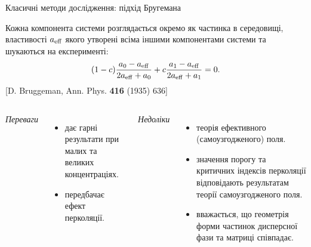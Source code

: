 \documentclass[10pt]{beamer}
\begin{document}
\begin{frame}{Класичні методи дослідження: підхід Бругемана}

\footnotesize
    Кожна компонента системи розглядається окремо як частинка в середовищі, властивості $a_{\rm eff}$ якого утворені всіма іншими компонентами системи та шукаються на експерименті:
    \begin{equation}\label{eq:EMA}
        (1-c) \frac{a_0 - a_{\rm eff}}{2a_{\rm eff} + a_0} + c \frac{a_1 - a_{\rm eff}}{2a_{\rm eff} + a_1} = 0.
    \end{equation}
    [D. Bruggeman, Ann. Phys. {\bf 416} (1935) 636]
    \vspace{-5pt}
    \begin{columns}[T,onlytextwidth]
          \begin{center}
          {\it Переваги}
          \end{center}
          \vspace{-10pt}
          \begin{itemize}
              \item дає гарні результати при малих та великих концентраціях.
              \item передбачає ефект перколяції.
          \end{itemize}
    
          \begin{center}
          {\it Недоліки}
          \end{center}
          \vspace{-10pt}
          \begin{itemize}
              \item теорія ефективного (самоузгодженого) поля.
              \item значення порогу та критичних індексів перколяції відповідають результатам теорії самоузгодженого поля.
              \item вважається, що геометрія форми частинок дисперсної фази та матриці співпадає.
          \end{itemize}
    \end{columns}
  
\end{frame}
\end{document}
